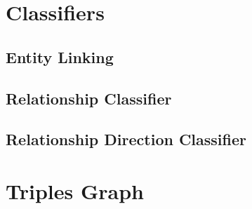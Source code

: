 \documentclass[11pt,a4paper]{article}
\begin{document}
\section{Classifiers}



\subsection{Entity Linking}
\label{subsec:ent_linking}




\subsection{Relationship Classifier}
\label{subsec:rel_classifier}


\subsection{Relationship Direction Classifier}
\label{subsec:rel_direction}






\section{Triples Graph}
\label{sec:triples_graph}








\end{document}
